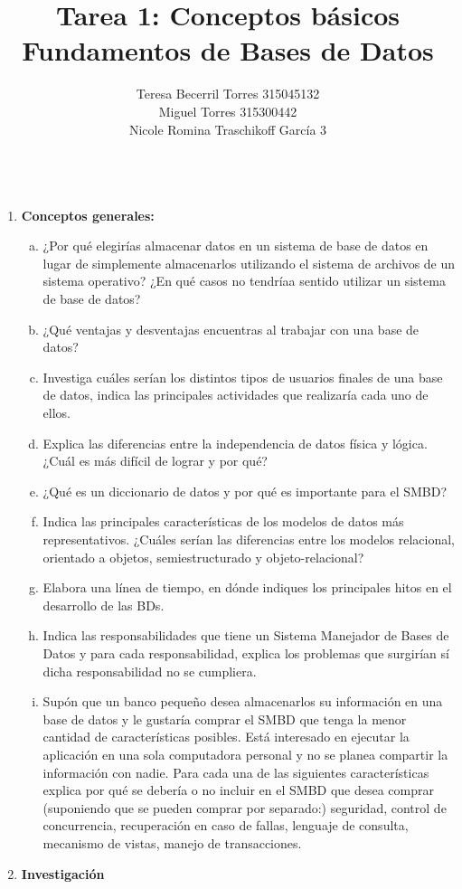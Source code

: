 \documentclass{article}
\title{Tarea 1: Conceptos básicos \\
        Fundamentos de Bases de Datos}
\author{Teresa Becerril Torres 315045132\\
        Miguel Torres 315300442\\
        Nicole Romina Traschikoff García 3\\
        \\}
\begin{document}
        \maketitle

    \begin{enumerate}
        \item \textbf{Conceptos generales:}
          \begin{enumerate}[a. ]
            \item ¿Por qué elegirías almacenar datos en un sistema de base de datos en lugar de simplemente almacenarlos 
            utilizando el sistema de archivos de un sistema operativo? ¿En qué casos no tendríaa sentido utilizar un sistema    
            de base de datos?
            \item ¿Qué ventajas y desventajas encuentras al trabajar con una base de datos?            
            \item Investiga cuáles serían los distintos tipos de usuarios finales de una base de datos, indica las principales 
            actividades que realizaría cada uno de ellos.
            \item Explica las diferencias entre la independencia de datos física y lógica. ¿Cuál es más difícil de lograr y    
            por qué?
            \item ¿Qué es un diccionario de datos y por qué es importante para el SMBD?
            \item Indica las principales características de los modelos de datos más representativos. ¿Cuáles serían las 
            diferencias entre los modelos relacional, orientado a objetos, semiestructurado y objeto-relacional?
            \item Elabora una línea de tiempo, en dónde indiques los principales hitos en el desarrollo de las BDs.
            \item Indica las responsabilidades que tiene un Sistema Manejador de Bases de Datos y para cada responsabilidad, 
            explica los problemas que surgirían sí dicha responsabilidad no se cumpliera.
            \item Supón que un banco pequeño desea almacenarlos su información en una base de datos y le gustaría comprar el 
            SMBD que tenga la menor cantidad de características posibles. Está interesado en ejecutar la aplicación en una 
            sola computadora personal y no se planea compartir la información con nadie. Para cada una de las siguientes 
            características explica por qué se debería o no incluir en el SMBD que desea comprar (suponiendo que se pueden 
            comprar por separado:) seguridad, control de concurrencia, recuperación en caso de fallas, lenguaje de consulta, 
            mecanismo de vistas, manejo de transacciones.
          \end{enumerate}
        \item \textbf{Investigación}
            \begin{enumerate}[a)]


\end{enumerate}
\end{enumerate}
\end{document}
